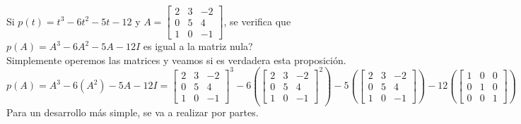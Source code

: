 \item Si \(p(t) = t^3 − 6t^2 − 5t − 12\) y 
    \(A = \left[\begin{smallmatrix}2 & 3 & -2 \\ 0 & 5 & 4 \\ 1 & 0 & -1\end{smallmatrix}\right]\), 
    se verifica que \(p(A) = A^3 − 6A^2 − 5A − 12I\) es igual a la matriz nula? \\
    Simplemente operemos las matrices y veamos si es verdadera esta proposición.
    \[
        p(A)=
        A^3 − 6(A^2) − 5A − 12I
        =
        \begin{bmatrix}
            2 & 3 & -2 \\ 
            0 & 5 & 4 \\ 
            1 & 0 & -1
        \end{bmatrix}^3
        -
        6
        \left(
        \begin{bmatrix}
            2 & 3 & -2 \\ 
            0 & 5 & 4 \\ 
            1 & 0 & -1
        \end{bmatrix}^2
        \right)
        -
        5
        \left(
        \begin{bmatrix}
            2 & 3 & -2 \\ 
            0 & 5 & 4 \\ 
            1 & 0 & -1
        \end{bmatrix}
        \right)
        -
        12
        \left(
        \begin{bmatrix}
            1 & 0 & 0 \\
            0 & 1 & 0 \\
            0 & 0 & 1
        \end{bmatrix}
        \right)
    \]
    Para un desarrollo más simple, se va a realizar por partes.
